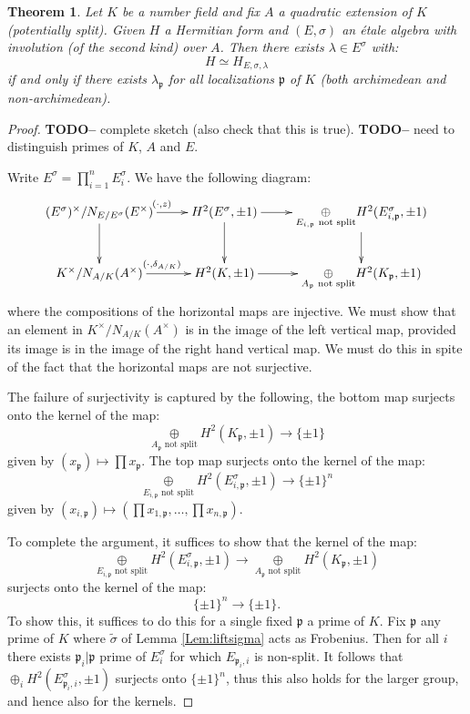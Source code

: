 \documentclass{article}
\theoremstyle{plain}
\newtheorem{theorem}{Theorem}[section]
\theoremstyle{definition}
\numberwithin{equation}{section}
\newcommand{\fp}{\mathfrak{p}}
\newcommand{\TODO}[1]{\textbf{TODO-#1}}
\begin{document}
\begin{theorem}
Let $K$ be a number field and fix $A$ a quadratic extension of $K$ (potentially split).
Given $H$ a Hermitian form and $(E,\sigma)$ an \'etale algebra with involution (of the second kind) over $A$. Then there exists $\lambda \in E^\sigma$ with:
\[ H \simeq H_{E,\sigma,\lambda} \]
if and only if there exists $\lambda_\fp$ for all localizations $\fp$ of $K$ (both archimedean and non-archimedean).
\end{theorem}
\begin{proof}
\TODO - complete sketch (also check that this is true).
\TODO - need to distinguish primes of $K$, $A$ and $E$.

Write $E^\sigma = \prod_{i=1}^n E^\sigma_i$.
We have the following diagram:
\[
\xymatrix{
(E^\sigma)^\times/N_{E/E^\sigma}(E^\times) \ar[r]^{(\cdot,z)} \ar[d]& H^2(E^\sigma, \pm 1) \ar[r] \ar[d]& \underset{E_{i,\fp} \text{ not split}}\oplus H^2(E^\sigma_{i,\fp},\pm 1) \ar[d]\\
K^\times/N_{A/K}(A^\times) \ar[r]^{(\cdot,\delta_{A/K})} & H^2(K, \pm 1) \ar[r] & \underset{A_\fp \text{ not split}}\oplus H^2(K_\fp,\pm 1)
}
\]
where the compositions of the horizontal maps are injective.
We must show that an element in $K^\times/N_{A/K}(A^\times) $ is in the image of the left vertical map, provided its image is in the image of the right hand vertical map.
We must do this in spite of the fact that the horizontal maps are not surjective.

The failure of surjectivity is captured by the following, the bottom map surjects onto the kernel of the map:
\[ \underset{A_\fp \text{ not split}}\oplus H^2(K_\fp,\pm 1)  \rightarrow \{ \pm1\} \]
given by $(x_\fp) \mapsto \prod x_\fp$. The top map surjects onto the kernel of the map:
\[ \underset{E_{i,\fp} \text{ not split}}\oplus H^2(E_{i,\fp}^\sigma,\pm 1)  \rightarrow \{ \pm1\}^n \]
given by $(x_{i,\fp}) \mapsto (\prod x_{1,\fp}, \ldots, \prod x_{n,\fp}) $.

To complete the argument, it suffices to show that the kernel of the map:
\[\underset{E_{i,\fp} \text{ not split}}\oplus H^2(E_{i,\fp}^\sigma,\pm 1)  \rightarrow \underset{A_\fp \text{ not split}}\oplus H^2(K_\fp,\pm 1) \]
surjects onto the kernel of the map:
\[ \{ \pm1\}^n \rightarrow \{ \pm1\}. \]
To show this, it suffices to do this for a single fixed $\fp$ a prime of $K$.
Fix $\fp$ any prime of $K$ where $\tilde{\sigma}$ of Lemma \ref{Lem:liftsigma} acts as Frobenius. Then for all $i$ there exists $\fp_i | \fp$ prime of $E_i^\sigma$ for which $E_{\fp_i,i}$ is non-split. It follows that $\oplus_i H^2(E_{\fp_i,i}^\sigma,\pm1)$ surjects onto $\{\pm 1\}^n$, thus this also holds for the larger group, and hence also for the kernels.
\end{proof}
\end{document}
